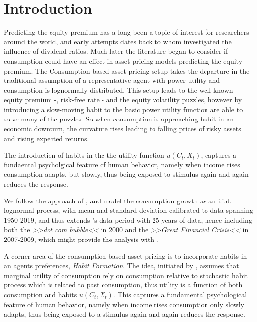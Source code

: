 \section{Introduction} \label{sec:Introduction}

Predicting the equity premium has a long been a topic of interest for researchers around the world, and early attempts dates back to \cite{Dow1920} whom investigated the influence of dividend ratios. Much later the literature began to consider if consumption could have an effect in asset pricing models predicting the equity premium. The Consumption based asset pricing setup takes the departure in the traditional assumption of a representative agent with power utility and consumption is lognormally distributed. This setup leads to the well known equity premium -, risk-free rate - and the equity volatility puzzles, however by introducing a slow-moving habit to the basic power utility function \cite{Campbell1999} are able to solve many of the puzzles. So when consumption is approaching habit in an economic downturn, the curvature rises leading to falling prices of risky assets and rising expected returns. 


The introduction of habits in the the utility function $u \left(C_t, X_t \right)$, captures a fundaental psycholgical feature of human behavior, namely when income rises consumption adapts, but slowly, thus being exposed to stimulus again and again reduces the response.

We follow the approach of \cite{Campbell1999}, and model the consumption growth as an i.i.d. lognormal process, with mean and standard deviation calibrated to data spanning 1950-2019, and thus extends \cite{Campbell1999}'s data period with 25 years of data, hence including both the \textit{>>dot com bubble<<} in 2000 and the \textit{>>Great Financial Crisis<<} in 2007-2009, which might provide the analysis with .




\midrule

A corner area of the consumption based asset pricing is to incorporate habits in an agents preferences, \textit{Habit Formation}. The idea, initiated by \citet{Constantinides_1990}, assumes that marginal utility of consumption rely on consumption relative to stochastic habit process which is related to past consumption, thus utility is a function of both consumption and habits $u \left(C_t, X_t \right)$. This captures a fundamental psychological feature of human behavior, namely when income rises consumption only slowly adapts, thus being exposed to a stimulus again and again reduces the response. 

